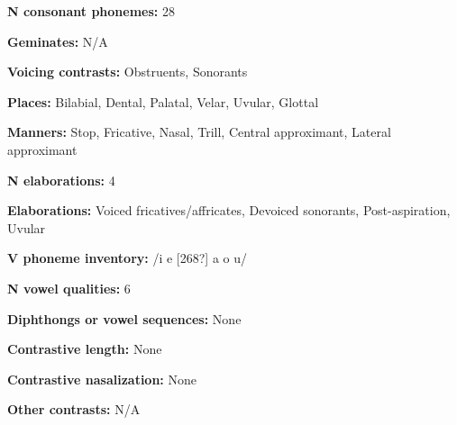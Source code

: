 \begin{styleBody}
\textbf{N consonant phonemes:} 28
\end{styleBody}

\begin{styleBody}
\textbf{Geminates:} N/A
\end{styleBody}

\begin{styleBody}
\textbf{Voicing contrasts:} Obstruents, Sonorants
\end{styleBody}

\begin{styleBody}
\textbf{Places:} Bilabial, Dental, Palatal, Velar, Uvular, Glottal
\end{styleBody}

\begin{styleBody}
\textbf{Manners:} Stop, Fricative, Nasal, Trill, Central approximant, Lateral approximant
\end{styleBody}

\begin{styleBody}
\textbf{N elaborations:} 4
\end{styleBody}

\begin{styleBody}
\textbf{Elaborations:} Voiced fricatives/affricates, Devoiced sonorants, Post-aspiration, Uvular
\end{styleBody}

\begin{styleBody}
\textbf{V phoneme inventory:} /i e [268?] a o u/
\end{styleBody}

\begin{styleBody}
\textbf{N vowel qualities:} 6
\end{styleBody}

\begin{styleBody}
\textbf{Diphthongs or vowel sequences: }None
\end{styleBody}

\begin{styleBody}
\textbf{Contrastive length:} None
\end{styleBody}

\begin{styleBody}
\textbf{Contrastive nasalization:} None
\end{styleBody}

\begin{styleBody}
\textbf{Other contrasts:} N/A
\end{styleBody}

